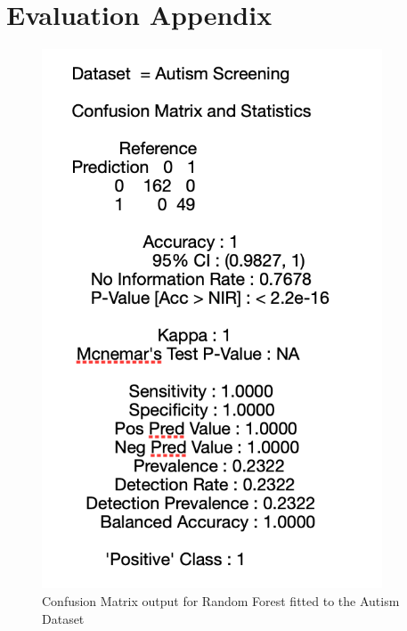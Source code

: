 \chapter{Evaluation Appendix}
\begin{figure}[!htbp]
    \centering
    \begin{minipage}{0.45\textwidth}
        \centering
        \includegraphics[width=0.9\textwidth]{ThesisTemplate/appendix/images/Chapter5Appendix/ConfusionMatrix/Autism.png} 
        \caption{Confusion Matrix output for Random Forest fitted to the Autism Dataset}
        \label{fig:my_label}
    \end{minipage}\hfill
    \begin{minipage}{0.45\textwidth}
        \centering

\end{minipage}
\end{figure}
